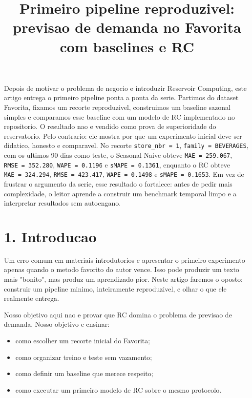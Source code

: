 \documentclass[12pt]{article}
\title{Primeiro pipeline reproduzivel: previsao de demanda no Favorita com baselines e RC}
\author{}
\providecommand{\tightlist}{%
  \setlength{\itemsep}{0pt}\setlength{\parskip}{0pt}}
\begin{document}
\maketitle

\begin{resumo}
Depois de motivar o problema de negocio e introduzir Reservoir Computing, este artigo entrega o primeiro pipeline ponta a ponta da serie. Partimos do dataset Favorita, fixamos um recorte reproduzivel, construimos um baseline sazonal simples e comparamos esse baseline com um modelo de RC implementado no repositorio. O resultado nao e vendido como prova de superioridade do reservatorio. Pelo contrario: ele mostra por que um experimento inicial deve ser didatico, honesto e comparavel. No recorte \texttt{store\_nbr\ =\ 1}, \texttt{family\ =\ BEVERAGES}, com os ultimos 90 dias como teste, o Seasonal Naive obteve \texttt{MAE\ =\ 259.067}, \texttt{RMSE\ =\ 352.280}, \texttt{WAPE\ =\ 0.1196} e \texttt{sMAPE\ =\ 0.1361}, enquanto o RC obteve \texttt{MAE\ =\ 324.294}, \texttt{RMSE\ =\ 423.417}, \texttt{WAPE\ =\ 0.1498} e \texttt{sMAPE\ =\ 0.1653}. Em vez de frustrar o argumento da serie, esse resultado o fortalece: antes de pedir mais complexidade, o leitor aprende a construir um benchmark temporal limpo e a interpretar resultados sem autoengano.
\end{resumo}

\section{1. Introducao}\label{1-introducao}

Um erro comum em materiais introdutorios e apresentar o primeiro experimento apenas quando o metodo favorito do autor vence. Isso pode produzir um texto mais "bonito", mas produz um aprendizado pior. Neste artigo faremos o oposto: construir um pipeline minimo, inteiramente reproduzivel, e olhar o que ele realmente entrega.

Nosso objetivo aqui nao e provar que RC domina o problema de previsao de demanda. Nosso objetivo e ensinar:

\begin{itemize}
\tightlist
\item
  como escolher um recorte inicial do Favorita;
\item
  como organizar treino e teste sem vazamento;
\item
  como definir um baseline que merece respeito;
\item
  como executar um primeiro modelo de RC sobre o mesmo protocolo.
\end{itemize}
\end{document}
